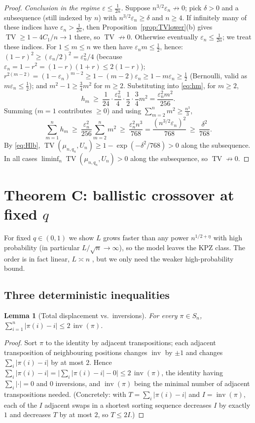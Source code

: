 \documentclass[12pt]{article}
\newtheorem{lemma}{Lemma}
\theoremstyle{definition}
\DeclareMathOperator{\inv}{inv}
\DeclareMathOperator{\TV}{TV}
\newcommand{\eps}{\varepsilon}
\begin{document}
\begin{proof}
\emph{Conclusion in the regime $\eps\le\tfrac1{2n}$.} Suppose $n^{3/2}\eps_n\not\to0$;
pick $\delta>0$ and a subsequence (still indexed by $n$) with $n^{3/2}\eps_n\ge\delta$
and $n\ge4$. If infinitely many of these indices have $\eps_n>\tfrac1{2n}$, then
Proposition~\ref{prop:TVlower}(b) gives $\TV\ge1-4C_1/n\to1$ there, so $\TV\not\to0$.
Otherwise eventually $\eps_n\le\tfrac1{2n}$; we treat these indices. For $1\le m\le n$ we
then have $\eps_n m\le\tfrac12$, hence:
$(1-r)^2\ge(\eps_n/2)^2=\eps_n^2/4$ (because $\eps_n=1-r^2=(1-r)(1+r)\le2(1-r)$);
$r^{2(m-2)}=(1-\eps_n)^{m-2}\ge1-(m-2)\eps_n\ge1-m\eps_n\ge\tfrac12$ (Bernoulli, valid as
$m\eps_n\le\tfrac12$); and $m^2-1\ge\tfrac34 m^2$ for $m\ge2$. Substituting into
\eqref{eq:hm}, for $m\ge2$,
\[
h_m\ \ge\ \frac{1}{24}\cdot\frac{\eps_n^2}{4}\cdot\frac12\cdot\frac34 m^2
=\frac{\eps_n^2 m^2}{256}.
\]
Summing ($m=1$ contributes $\ge0$) and using $\sum_{m=2}^n m^2\ge\tfrac{n^3}{3}$,
\[
\sum_{m=1}^n h_m\ \ge\ \frac{\eps_n^2}{256}\sum_{m=2}^n m^2
\ \ge\ \frac{\eps_n^2 n^3}{768}=\frac{(n^{3/2}\eps_n)^2}{768}\ \ge\ \frac{\delta^2}{768}.
\]
By \eqref{eq:Hlb}, $\TV(\mu_{n,q_n},U_n)\ge 1-\exp(-\delta^2/768)>0$ along the
subsequence. In all cases $\liminf_n\TV(\mu_{n,q_n},U_n)>0$ along the subsequence, so
$\TV\not\to0$.
\end{proof}

\section{Theorem C: ballistic crossover at fixed $q$}\label{sec:C}

For fixed $q\in(0,1)$ we show $L$ grows faster than any power $n^{1/2+\eta}$ with high probability (in particular $L/\sqrt n\to\infty$), so the model leaves the KPZ class. The order is in fact linear, $L\asymp n$ \cite{BP}, but we only need the weaker high-probability bound.

\subsection{Three deterministic inequalities}
\begin{lemma}[Total displacement vs.\ inversions]\label{lem:tdisp}
For every $\pi\in S_n$, $\displaystyle\sum_{i=1}^n|\pi(i)-i|\le 2\,\inv(\pi)$.
\end{lemma}
\begin{proof}
Sort $\pi$ to the identity by adjacent transpositions; each adjacent transposition of
neighbouring positions changes $\inv$ by $\pm1$ and changes $\sum_i|\pi(i)-i|$ by at
most $2$. Hence $\sum_i|\pi(i)-i|=\big|\sum_i|\pi(i)-i|-0\big|\le 2\,\inv(\pi)$, the
identity having $\sum_i|\cdot|=0$ and $0$ inversions, and $\inv(\pi)$ being the minimal
number of adjacent transpositions needed. (Concretely: with $T=\sum_i|\pi(i)-i|$ and
$I=\inv(\pi)$, each of the $I$ adjacent swaps in a shortest sorting sequence decreases
$I$ by exactly $1$ and decreases $T$ by at most $2$, so $T\le 2I$.)
\end{proof}
\end{document}
